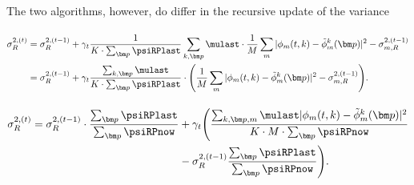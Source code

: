 The two algorithms, however, do differ in the recursive update of the variance

\paragraph{}
\begin{align}
\label{eq:trem-var}
    \sigma_R^{2,(t)} &= \sigma_R^{2,(t-1)}+\gamma_t\frac{1}{K\*\sum_{\bm p}\psiRPlast} \sum_{k,\bm p}\mulast\*\frac{1}{M}\sum_{m}|\phi_m(t,k)-\tilde\phi_m^k(\bm p)|^2-\sigma_{m,R}^{2,(t-1)}\\
                     &= \sigma_R^{2,(t-1)}+\gamma_t\frac{\sum_{k,\bm p}\mulast}{K\*\sum_{\bm p}\psiRPlast} \*\Bigg ( \frac{1}{M}\sum_{m}|\phi_m(t,k)-\tilde\phi_m^k(\bm p)|^2-\sigma_{m,R}^{2,(t-1)}\Bigg ).
\end{align}

\paragraph{}
\begin{align}
\label{eq:crem-var}
    \sigma_R^{2,(t)} = \sigma_R^{2,(t-1)}\cdot\frac{\sum_{\bm p}\psiRPlast}{\sum_{\bm p}\psiRPnow}&+\gamma_t\Bigg ( \frac{\sum_{k,\bm p,m}\mulast|\phi_m(t,k)-\tilde\phi_m^k(\bm p)|^2}{K \* M \* \sum_{\bm p}\psiRPnow}\\
    &-\sigma_R^{2,(t-1)}\frac{\sum_{\bm p}\psiRPlast}{\sum_{\bm p}\psiRPnow} \Bigg ).
\end{align}






